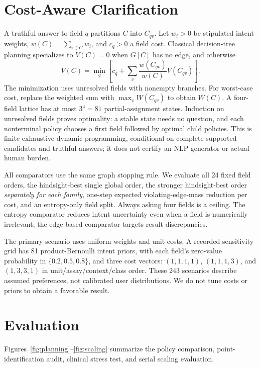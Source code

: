 \section{Cost-Aware Clarification}
A truthful answer to field $q$ partitions $C$ into $C_{qv}$. Let $w_i>0$ be stipulated intent weights, $w(C)=\sum_{i\in C}w_i$, and $c_q>0$ a field cost. Classical decision-tree planning \cite{garey} specializes to $V(C)=0$ when $G[C]$ has no edge, and otherwise
\begin{equation}
 V(C)=\min_q\left[c_q+\sum_v\frac{w(C_{qv})}{w(C)}V(C_{qv})\right].
\label{eq:bellman}
\end{equation}
The minimization uses unresolved fields with nonempty branches. For worst-case cost, replace the weighted sum with $\max_v W(C_{qv})$ to obtain $W(C)$. A four-field lattice has at most $3^4=81$ partial-assignment states. Induction on unresolved fields proves optimality: a stable state needs no question, and each nonterminal policy chooses a first field followed by optimal child policies. This is finite exhaustive dynamic programming, conditional on complete supported candidates and truthful answers; it does not certify an NLP generator or actual human burden.

All comparators use the same graph stopping rule. We evaluate all 24 fixed field orders, the hindsight-best single global order, the stronger hindsight-best order \emph{separately for each family}, one-step expected violating-edge-mass reduction per cost, and an entropy-only field split. Always asking four fields is a ceiling. The entropy comparator reduces intent uncertainty even when a field is numerically irrelevant; the edge-based comparator targets result discrepancies.

The primary scenario uses uniform weights and unit costs. A recorded sensitivity grid has 81 product-Bernoulli intent priors, with each field's zero-value probability in $\{0.2,0.5,0.8\}$, and three cost vectors: $(1,1,1,1)$, $(1,1,1,3)$, and $(1,3,3,1)$ in unit/assay/context/class order. These 243 scenarios describe assumed preferences, not calibrated user distributions. We do not tune costs or priors to obtain a favorable result.

\section{Evaluation}
Figures~\ref{fig:planning}--\ref{fig:scaling} summarize the policy comparison, point-identification audit, clinical stress test, and serial scaling evaluation.

